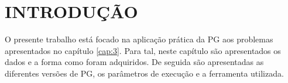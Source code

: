 \section{INTRODUÇÃO}
\label{sec:5introducao}


O presente trabalho está focado na aplicação prática da \ac{PG} aos problemas apresentados no capítulo \ref{cap:3}. 
Para tal, neste capítulo são apresentados os dados e a forma como foram adquiridos. 
De seguida são apresentadas as diferentes versões de \ac{PG}, os parâmetros de execução e a ferramenta utilizada.